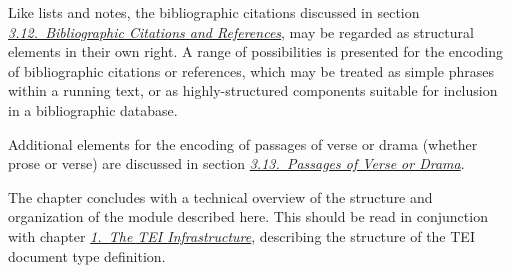 Like lists and notes, the bibliographic citations discussed in section \textit{\hyperref[COBI]{3.12.\ Bibliographic Citations and References}}, may be regarded as structural elements in their own right. A range of possibilities is presented for the encoding of bibliographic citations or references, which may be treated as simple phrases within a running text, or as highly-structured components suitable for inclusion in a bibliographic database.\par
Additional elements for the encoding of passages of verse or drama (whether prose or verse) are discussed in section \textit{\hyperref[CODV]{3.13.\ Passages of Verse or Drama}}.\par
The chapter concludes with a technical overview of the structure and organization of the module described here. This should be read in conjunction with chapter \textit{\hyperref[ST]{1.\ The TEI Infrastructure}}, describing the structure of the TEI document type definition.

